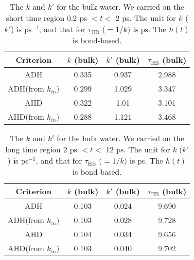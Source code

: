 {%
\begin{table}[htbp]
\centering
\caption{\label{tab:k_k_prime_128w_1} 
    The $k$ and $k'$ for the bulk water. We carried on the short time region 0.2 ps $< t <$ 2 ps. 
The unit for $k$ ($k'$) is ps$^{-1}$, and that for $\tau_{\text{HB}}$ ($=1/k$) is ps. The $h(t)$ is bond-based.} 
\begin{tabular}{cccc}
 Criterion & $k$  (bulk) & $k'$ (bulk) & $\tau_{\text{HB}}$ (bulk) \\
\hline
  ADH & 0.335 & 0.937 & 2.988  \\
  ADH(from $k_{in}$) & 0.299  & 1.029 & 3.347   \\
  AHD & 0.322 & 1.01 & 3.101 \\ 
  AHD(from $k_{in}$) & 0.288 & 1.121 & 3.468 \\ 
\end{tabular}
\end{table}
%
\begin{table}[htbp]
\centering
\caption{\label{tab:k_k_prime_128w_2} 
    The $k$ and $k'$ for the bulk water. We carried on the long time region 2 ps $< t <$ 12 ps. 
The unit for $k$ ($k'$) is ps$^{-1}$, and that for $\tau_{\text{HB}}$ ($=1/k$) is ps. The $h(t)$ is bond-based.} 
\begin{tabular}{cccc}
 Criterion & $k$  (bulk) & $k'$ (bulk) & $\tau_{\text{HB}}$ (bulk) \\
\hline
  ADH & 0.103 & 0.024 & 9.690 \\
  ADH(from $k_{in}$) & 0.103  & 0.028 & 9.728 \\
  AHD & 0.104 & 0.034 & 9.656  \\
  AHD(from $k_{in}$) & 0.103  & 0.040 & 9.702  \\
\end{tabular}
\end{table}

}
